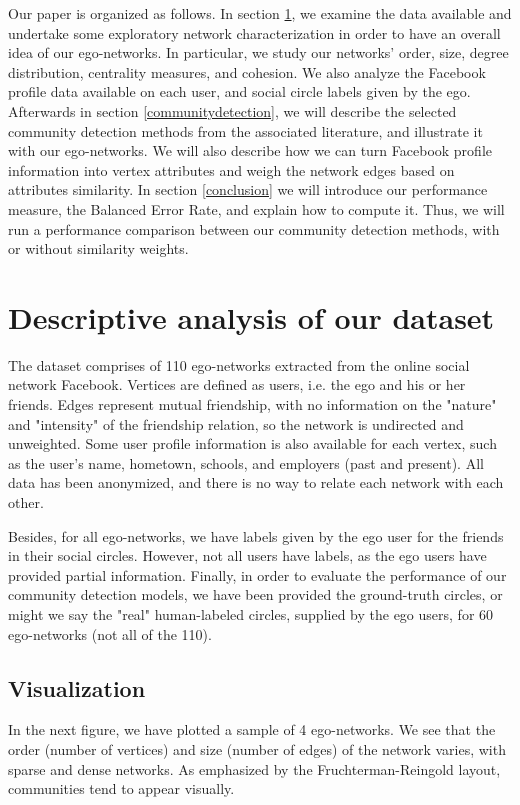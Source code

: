 \documentclass[11pt]{article}       %
\begin{document}
Our paper is organized as follows. In section \ref{datasetdescription}, we examine the data available and undertake some exploratory network characterization in order to have an overall idea of our ego-networks. In particular, we study our networks' order, size, degree distribution, centrality measures, and cohesion. We also analyze the Facebook profile data available on each user, and social circle labels given by the ego. Afterwards in section \ref{communitydetection}, we will describe the selected community detection methods from the associated literature, and illustrate it with our ego-networks. We will also describe how we can turn Facebook profile information into vertex attributes and weigh the network edges based on attributes similarity. In section \ref{conclusion} we will introduce our performance measure, the Balanced Error Rate, and explain how to compute it. Thus, we will run a performance comparison between our community detection methods, with or without similarity weights.

\section{Descriptive analysis of our dataset} \label{datasetdescription}

The dataset \cite{dataset} comprises of 110 ego-networks extracted from the online social network Facebook. Vertices are defined as users, i.e. the ego and his or her friends. Edges represent mutual friendship, with no information on the "nature" and "intensity" of the friendship relation, so the network is undirected and unweighted. Some user profile information is also available for each vertex, such as the user's name, hometown, schools, and employers (past and present). All data has been anonymized, and there is no way to relate each network with each other. 

Besides, for all ego-networks, we have labels given by the ego user for the friends in their social circles. However, not all users have labels, as the ego users have provided partial information. Finally, in order to evaluate the performance of our community detection models, we have been provided the ground-truth circles, or might we say the "real" human-labeled circles, supplied by the ego users, for 60 ego-networks (not all of the 110).


\newpage
\subsection{Visualization} \label{viz}
In the next figure, we have plotted a sample of 4 ego-networks. We see that the order (number of vertices) and size (number of edges) of the network varies, with sparse and dense networks. As emphasized by the Fruchterman-Reingold layout, communities tend to appear visually. 
\end{document}
